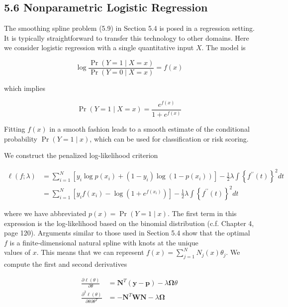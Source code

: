 \documentclass[10pt]{article}
\begin{document}
\subsection*{5.6 Nonparametric Logistic Regression}
The smoothing spline problem (5.9) in Section 5.4 is posed in a regression setting. It is typically straightforward to transfer this technology to other domains. Here we consider logistic regression with a single quantitative input $X$. The model is


\begin{equation*}
\log \frac{\operatorname{Pr}(Y=1 \mid X=x)}{\operatorname{Pr}(Y=0 \mid X=x)}=f(x) \tag{5.28}
\end{equation*}


which implies


\begin{equation*}
\operatorname{Pr}(Y=1 \mid X=x)=\frac{e^{f(x)}}{1+e^{f(x)}} \tag{5.29}
\end{equation*}


Fitting $f(x)$ in a smooth fashion leads to a smooth estimate of the conditional probability $\operatorname{Pr}(Y=1 \mid x)$, which can be used for classification or risk scoring.

We construct the penalized log-likelihood criterion


\begin{align*}
\ell(f ; \lambda) & =\sum_{i=1}^{N}\left[y_{i} \log p\left(x_{i}\right)+\left(1-y_{i}\right) \log \left(1-p\left(x_{i}\right)\right)\right]-\frac{1}{2} \lambda \int\left\{f^{\prime \prime}(t)\right\}^{2} d t \\
& =\sum_{i=1}^{N}\left[y_{i} f\left(x_{i}\right)-\log \left(1+e^{f\left(x_{i}\right)}\right)\right]-\frac{1}{2} \lambda \int\left\{f^{\prime \prime}(t)\right\}^{2} d t \tag{5.30}
\end{align*}


where we have abbreviated $p(x)=\operatorname{Pr}(Y=1 \mid x)$. The first term in this expression is the log-likelihood based on the binomial distribution (c.f. Chapter 4, page 120). Arguments similar to those used in Section 5.4 show that the optimal $f$ is a finite-dimensional natural spline with knots at the unique\\
values of $x$. This means that we can represent $f(x)=\sum_{j=1}^{N} N_{j}(x) \theta_{j}$. We compute the first and second derivatives


\begin{align*}
\frac{\partial \ell(\theta)}{\partial \theta} & =\mathbf{N}^{T}(\mathbf{y}-\mathbf{p})-\lambda \boldsymbol{\Omega} \theta  \tag{5.31}\\
\frac{\partial^{2} \ell(\theta)}{\partial \theta \partial \theta^{T}} & =-\mathbf{N}^{T} \mathbf{W} \mathbf{N}-\lambda \boldsymbol{\Omega} \tag{5.32}
\end{align*}
\end{document}
